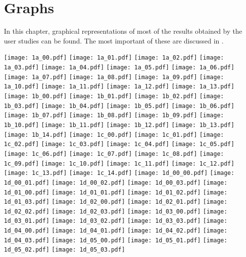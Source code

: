 \chapter{Graphs}
\vspace{-.4cm}
In this chapter, graphical representations of most of the results obtained by the user studies can be found. The most important of these are discussed in .
\vspace{-.6cm}

\graphicspath{ {C:/Users/Jimi/Dropbox/MasterProject/results/graphs/} }
\begin{center}
\texttt{[image: 1a\_00.pdf]}
\texttt{[image: 1a\_01.pdf]}
\texttt{[image: 1a\_02.pdf]}
\texttt{[image: 1a\_03.pdf]}
\texttt{[image: 1a\_04.pdf]}
\texttt{[image: 1a\_05.pdf]}
\texttt{[image: 1a\_06.pdf]}
\texttt{[image: 1a\_07.pdf]}
\texttt{[image: 1a\_08.pdf]}
\texttt{[image: 1a\_09.pdf]}
\texttt{[image: 1a\_10.pdf]}
\texttt{[image: 1a\_11.pdf]}
\texttt{[image: 1a\_12.pdf]}
\texttt{[image: 1a\_13.pdf]}
\texttt{[image: 1b\_00.pdf]}
\texttt{[image: 1b\_01.pdf]}
\texttt{[image: 1b\_02.pdf]}
\texttt{[image: 1b\_03.pdf]}
\texttt{[image: 1b\_04.pdf]}
\texttt{[image: 1b\_05.pdf]}
\texttt{[image: 1b\_06.pdf]}
\texttt{[image: 1b\_07.pdf]}
\texttt{[image: 1b\_08.pdf]}
\texttt{[image: 1b\_09.pdf]}
\texttt{[image: 1b\_10.pdf]}
\texttt{[image: 1b\_11.pdf]}
\texttt{[image: 1b\_12.pdf]}
\texttt{[image: 1b\_13.pdf]}
\texttt{[image: 1b\_14.pdf]}
\texttt{[image: 1c\_00.pdf]}
\texttt{[image: 1c\_01.pdf]}
\texttt{[image: 1c\_02.pdf]}
\texttt{[image: 1c\_03.pdf]}
\texttt{[image: 1c\_04.pdf]}
\texttt{[image: 1c\_05.pdf]}
\texttt{[image: 1c\_06.pdf]}
\texttt{[image: 1c\_07.pdf]}
\texttt{[image: 1c\_08.pdf]}
\texttt{[image: 1c\_09.pdf]}
\texttt{[image: 1c\_10.pdf]}
\texttt{[image: 1c\_11.pdf]}
\texttt{[image: 1c\_12.pdf]}
\texttt{[image: 1c\_13.pdf]}
\texttt{[image: 1c\_14.pdf]}
\texttt{[image: 1d\_00\_00.pdf]}
\texttt{[image: 1d\_00\_01.pdf]}
\texttt{[image: 1d\_00\_02.pdf]}
\texttt{[image: 1d\_00\_03.pdf]}
\texttt{[image: 1d\_01\_00.pdf]}
\texttt{[image: 1d\_01\_01.pdf]}
\texttt{[image: 1d\_01\_02.pdf]}
\texttt{[image: 1d\_01\_03.pdf]}
\texttt{[image: 1d\_02\_00.pdf]}
\texttt{[image: 1d\_02\_01.pdf]}
\texttt{[image: 1d\_02\_02.pdf]}
\texttt{[image: 1d\_02\_03.pdf]}
\texttt{[image: 1d\_03\_00.pdf]}
\texttt{[image: 1d\_03\_01.pdf]}
\texttt{[image: 1d\_03\_02.pdf]}
\texttt{[image: 1d\_03\_03.pdf]}
\texttt{[image: 1d\_04\_00.pdf]}
\texttt{[image: 1d\_04\_01.pdf]}
\texttt{[image: 1d\_04\_02.pdf]}
\texttt{[image: 1d\_04\_03.pdf]}
\texttt{[image: 1d\_05\_00.pdf]}
\texttt{[image: 1d\_05\_01.pdf]}
\texttt{[image: 1d\_05\_02.pdf]}
\texttt{[image: 1d\_05\_03.pdf]}

\end{center}

